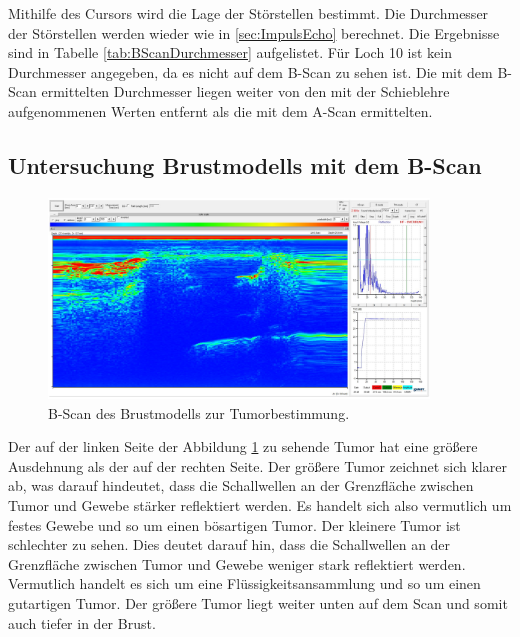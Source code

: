 Mithilfe des Cursors wird die Lage der Störstellen bestimmt.
Die Durchmesser der Störstellen werden wieder wie in \autoref{sec:ImpulsEcho} berechnet.
Die Ergebnisse sind in Tabelle \ref{tab:BScanDurchmesser} aufgelistet.
Für Loch 10 ist kein Durchmesser angegeben, da es nicht auf dem B-Scan zu sehen ist.
Die mit dem B-Scan ermittelten Durchmesser liegen weiter von den mit der Schieblehre aufgenommenen Werten entfernt als die mit dem A-Scan ermittelten.

\subsection{Untersuchung Brustmodells mit dem B-Scan}
\label{sec:BScanBrust}

\begin{figure}
    \centering
    \includegraphics[width=0.9\textwidth]{img/BrustB-Scan.png}
    \caption{B-Scan des Brustmodells zur Tumorbestimmung.}
    \label{fig:BScanBrust}
\end{figure}

Der auf der linken Seite der Abbildung \ref{fig:BScanBrust} zu sehende Tumor hat eine größere Ausdehnung als der auf der rechten Seite.
Der größere Tumor zeichnet sich klarer ab, was darauf hindeutet, dass die Schallwellen an der Grenzfläche zwischen Tumor und Gewebe stärker reflektiert werden.
Es handelt sich also vermutlich um festes Gewebe und so um einen bösartigen Tumor.
Der kleinere Tumor ist schlechter zu sehen. Dies deutet darauf hin, dass die Schallwellen an der Grenzfläche zwischen Tumor und Gewebe weniger stark reflektiert werden.
Vermutlich handelt es sich um eine Flüssigkeitsansammlung und so um einen gutartigen Tumor.
Der größere Tumor liegt weiter unten auf dem Scan und somit auch tiefer in der Brust.